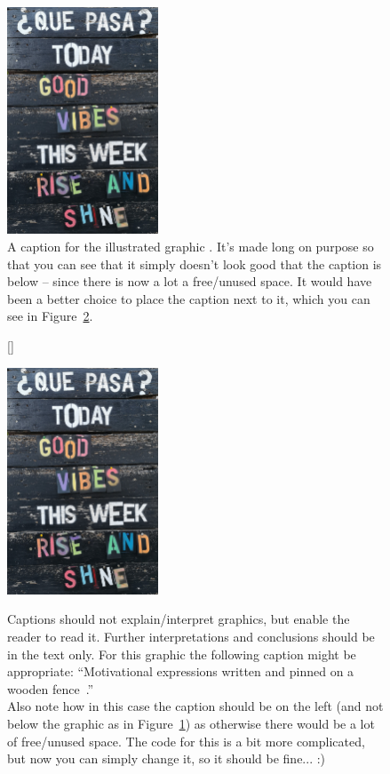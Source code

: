 \begin{figure}[th!]
  \includegraphics[width=4.5cm]{figures/pexels-ann-h-3095771.jpg}
  \caption{A caption for the illustrated graphic \citep{pictureSource}. It's made long on purpose so that you can see that it simply doesn't look good that the caption is below -- since there is now a lot a free/unused space. It would have been a better choice to place the caption next to it, which you can see in Figure~\ref{fig:graphicCaptionAside}.\label{fig:graphicCaptionBelow}}
\end{figure}%
%
\begin{figure}[bh!]
  [\FBwidth]
  {\caption{Captions should not explain/interpret graphics, but enable the reader to read it. Further interpretations and conclusions should be in the text only. For this graphic the following caption might be appropriate: ``Motivational expressions written and pinned on a wooden fence~\citep{pictureSource}.''\ \\[1em]
  Also note how in this case the caption should be on the left (and not below the graphic as in Figure~\ref{fig:graphicCaptionBelow}) as otherwise there would be a lot of free/unused space. The code for this is a bit more complicated, but now you can simply change it, so it should be fine... :) \label{fig:graphicCaptionAside}}}
  {\includegraphics[width=4.5cm]{figures/pexels-ann-h-3095771.jpg}}
\end{figure}
